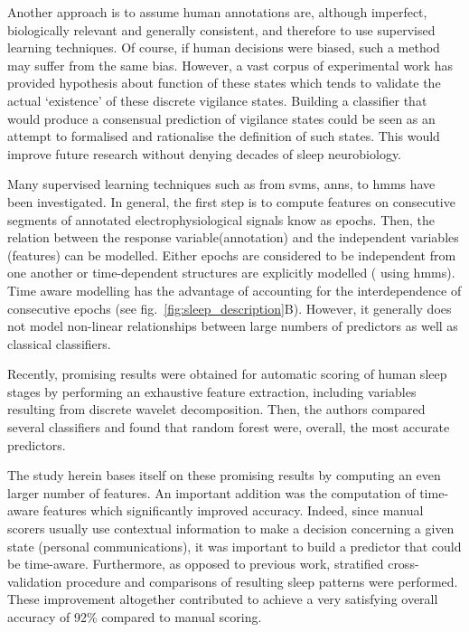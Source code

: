 Another approach is to assume human annotations are, although imperfect, biologically relevant and generally consistent,
 and therefore to use supervised learning
 techniques\cite{crisler_sleep-stage_2008,ventouras_performance_2012,doroshenkov_classification_2007,pan_transition-constrained_2012,sen_comparative_2014}.
  Of course, if human decisions were biased, such a method may suffer from the same bias.
However, a vast corpus of experimental work has provided hypothesis about function of these states which tends to validate the actual `existence' of these discrete vigilance states\cite{diekelmann_memory_2010}.
Building a classifier that would produce a consensual prediction of vigilance states could be seen as an attempt to formalised and rationalise the definition of such states.
This would improve future research without denying decades of sleep neurobiology.

Many supervised learning techniques such as from
\glspl{svm}\cite{crisler_sleep-stage_2008},
\glspl{ann}\cite{ventouras_performance_2012},
to
\glspl{hmm}\cite{doroshenkov_classification_2007,pan_transition-constrained_2012} have been investigated.
In general, the first step is to compute features on consecutive segments of annotated electrophysiological signals know as epochs.
Then, the relation between the response variable(annotation) and the independent variables (features) can be modelled.
Either epochs are considered to be independent from one another or time-dependent structures are explicitly modelled (\eg{} using \glspl{hmm}).
Time aware modelling has the advantage of accounting for the interdependence of consecutive epochs (see fig.~\ref{fig:sleep_description}B).
However, it generally does not model non-linear relationships between large numbers of predictors as well as classical classifiers.

Recently, promising results were obtained for automatic scoring of human sleep stages by performing an exhaustive
feature extraction, including variables resulting from discrete wavelet
decomposition\cite{sen_comparative_2014}.
Then, the authors compared several classifiers and found that random
forest\cite{breiman_random_2001} were, overall, the most accurate predictors.

The study herein bases itself on these promising results by computing an even larger number of features.
An important addition was the computation of time-aware
features\cite{dietterich_machine_2002,deng_time_2013} which significantly improved
accuracy. 
Indeed, since manual scorers usually use contextual information to make a decision concerning a given state (personal communications),
it was important to build a predictor that could be time-aware.
Furthermore, as opposed to previous work, stratified cross-validation\cite{ding_querying_2008} procedure and
comparisons of resulting sleep patterns were performed.
These improvement altogether contributed to achieve a very satisfying overall accuracy of 92\% compared to manual scoring.


